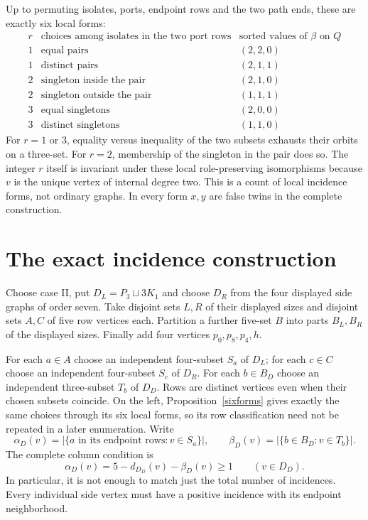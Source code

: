 \documentclass[11pt]{article}
\begin{document}
Up to permuting isolates, ports, endpoint rows and the two path ends,
these are exactly six local forms:
\[
\begin{array}{c|l|l}
 r&\text{choices among isolates in the two port rows}
   &\text{sorted values of }\beta\text{ on }Q\\\hline
 1&\text{equal pairs}&(2,2,0)\\
 1&\text{distinct pairs}&(2,1,1)\\
 2&\text{singleton inside the pair}&(2,1,0)\\
 2&\text{singleton outside the pair}&(1,1,1)\\
 3&\text{equal singletons}&(2,0,0)\\
 3&\text{distinct singletons}&(1,1,0)
\end{array}
\]
For $r=1$ or $3$, equality versus inequality of the two subsets exhausts
their orbits on a three-set. For $r=2$, membership of the singleton in
the pair does so. The integer $r$ itself is invariant under these local
role-preserving isomorphisms because $v$ is the unique vertex of internal
degree two. This is a count of local incidence forms, not ordinary graphs.
In every form $x,y$ are false twins in the complete construction.

\section*{The exact incidence construction}

Choose case II, put $D_L=P_3\sqcup3K_1$ and choose $D_R$ from the four
displayed side graphs of order seven. Take disjoint sets $L,R$ of their
displayed sizes and disjoint
sets $A,C$ of five row vertices each. Partition a further five-set $B$
into parts $B_L,B_R$ of the displayed sizes. Finally add four vertices
$p_0,p_8,p_4,h$.

For each $a\in A$ choose an independent four-subset $S_a$ of $D_L$;
for each $c\in C$ choose an independent four-subset $S_c$ of $D_R$.
For each $b\in B_D$ choose an independent three-subset $T_b$ of $D_D$.
Rows are distinct vertices even when their chosen subsets coincide.
On the left, Proposition~\ref{sixforms} gives exactly the same choices
through its six local forms, so its row classification need not be
repeated in a later enumeration.
Write
\[
 \alpha_D(v)=|\{a\text{ in its endpoint rows}:v\in S_a\}|,
 \qquad
 \beta_D(v)=|\{b\in B_D:v\in T_b\}|.
\]
The complete column condition is
\begin{equation}\label{column}
 \alpha_D(v)=5-d_{D_D}(v)-\beta_D(v)\geq1
 \qquad(v\in D_D).
\end{equation}
In particular, it is not enough to match just the total number of
incidences. Every individual side vertex must have a positive incidence
with its endpoint neighborhood.
\end{document}
